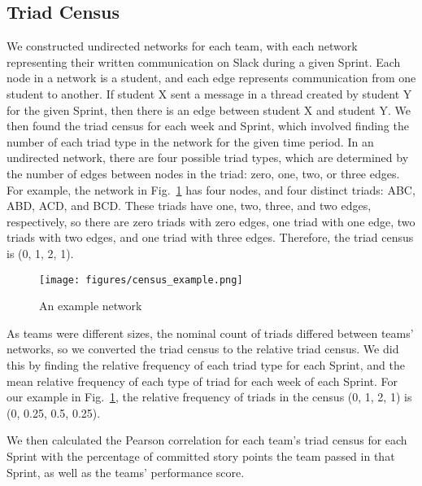 \subsection{Triad Census}
We constructed undirected networks for each team, with each network representing their written communication on Slack during a given Sprint. Each node in a network is a student, and each edge represents communication from one student to another. If student X sent a message in a thread created by student Y for the given Sprint, then there is an edge between student X and student Y. We then found the triad census for each week and Sprint, which involved finding the number of each triad type in the network for the given time period. In an undirected network, there are four possible triad types, which are determined by the number of edges between nodes in the triad: zero, one, two, or three edges. For example, the network in Fig.~\ref{fig:census_example} has four nodes, and four distinct triads: ABC, ABD, ACD, and BCD. These triads have one, two, three, and two edges, respectively, so there are zero triads with zero edges, one triad with one edge, two triads with two edges, and one triad with three edges. Therefore, the triad census is (0, 1, 2, 1).

\begin{figure}
    \centering
    \texttt{[image: figures/census\_example.png]}
    \caption{An example network}
    \label{fig:census_example}
\end{figure}

As teams were different sizes, the nominal count of triads differed between teams' networks, so we converted the triad census to the relative triad census. We did this by finding the relative frequency of each triad type for each Sprint, and the mean relative frequency of each type of triad for each week of each Sprint. For our example in Fig.~\ref{fig:census_example}, the relative frequency of triads in the census (0, 1, 2, 1) is (0, 0.25, 0.5, 0.25).

We then calculated the Pearson correlation for each team's triad census for each Sprint with the percentage of committed story points the team passed in that Sprint, as well as the teams' performance score.

